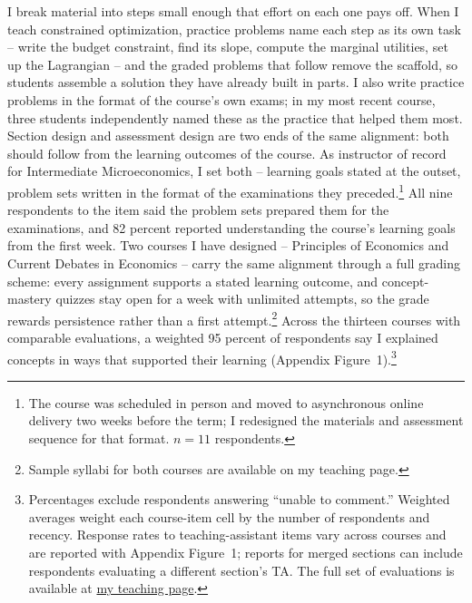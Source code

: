 \documentclass[letter,11pt]{article}
\begin{document}
I break material into steps small enough that effort on each one pays off. When I teach constrained optimization, practice problems name each step as its own task -- write the budget constraint, find its slope, compute the marginal utilities, set up the Lagrangian -- and the graded problems that follow remove the scaffold, so students assemble a solution they have already built in parts. I also write practice problems in the format of the course's own exams; in my most recent course, three students independently named these as the practice that helped them most. Section design and assessment design are two ends of the same alignment: both should follow from the learning outcomes of the course. As instructor of record for Intermediate Microeconomics, I set both -- learning goals stated at the outset, problem sets written in the format of the examinations they preceded.\footnote{The course was scheduled in person and moved to asynchronous online delivery two weeks before the term; I redesigned the materials and assessment sequence for that format. $n = 11$ respondents.} All nine respondents to the item said the problem sets prepared them for the examinations, and 82 percent reported understanding the course's learning goals from the first week. Two courses I have designed -- Principles of Economics and Current Debates in Economics -- carry the same alignment through a full grading scheme: every assignment supports a stated learning outcome, and concept-mastery quizzes stay open for a week with unlimited attempts, so the grade rewards persistence rather than a first attempt.\footnote{Sample syllabi for both courses are available on my teaching page.} Across the thirteen courses with comparable evaluations, a weighted 95 percent of respondents say I explained concepts in ways that supported their learning (Appendix Figure~1).\footnote{Percentages exclude respondents answering ``unable to comment.'' Weighted averages weight each course-item cell by the number of respondents and recency. Response rates to teaching-assistant items vary across courses and are reported with Appendix Figure~1; reports for merged sections can include respondents evaluating a different section's TA. The full set of evaluations is available at \href{https://gagandeep-sachdeva.com/teaching.html}{my teaching page}.
}

\end{document}
